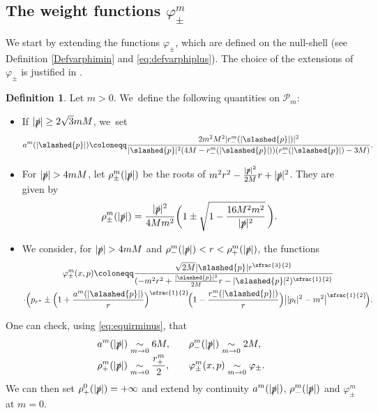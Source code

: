 \documentclass[JEP,XML,SOM,Unicode,published]{cedram}
\theoremstyle{plain}
\theoremstyle{definition}
\newtheorem{definition}[proposition]{Definition}
\newcommand{\isEquivTo}[1]{\underset{#1}{\sim}}
\begin{document}
\subsection{The weight functions $\varphi_{\pm}^m$}

We start by extending the functions $\varphi_\pm$, which are defined on the null-shell (see Definition \ref{Defvarphimin} and \eqref{eq:defvarphiplus}). The choice of the extensions of $\varphi_\pm$ is justified in \cite[\S 5.1.4]{V24}.

\begin{definition}
Let $m > 0$. We~define the following quantities on $\mathcal{P}_m$:
\begin{itemize}
\item If $|\slashed{p}| \geq 2\sqrt{3}mM$, we~set
\[
a^m(|\slashed{p}|) \coloneqq \frac{2m^2M^2|r^{m}_-(|\slashed{p}|)|^3}{|\slashed{p}|^2(4M-r^{m}_-(|\slashed{p}|))(r^{m}_-(|\slashed{p}|)-3M)}.
\]
\item For $|\slashed{p}| >4mM$, let $\rho^m_{\pm}(|\slashed{p}|)$ be the roots of $m^2 r^2-\frac{|\slashed{p}|^2}{2M}r+|\slashed{p}|^2$. They are given by
\[
\rho_{\pm}^{m}(|\slashed{p}|)=\frac{|\slashed{p}|^2}{4Mm^2}\biggl(1\pm \sqrt{1-\frac{16M^2m^2}{|\slashed{p}|^2}} \, \biggr).
\]
\item We consider, for $|\slashed{p}| >4mM$ and $ \rho_{-}^{m}(|\slashed{p}|) < r < \rho_{+}^{m}(|\slashed{p}|)$, the functions
\begin{multline*}
\varphi_{\pm}^m(x,p) \coloneqq \frac{ \sqrt{2M}|\slashed{p}|r^{\sfrac{3}{2}}}{(-m^2r^2+\frac{|\slashed{p}|^2}{2M}r-|\slashed{p}|^2)^{\sfrac{1}{2}}}\\
\cdot\Bigl(p_{r^*}\pm\Bigl(1+\frac{a^{m}(|\slashed{p}|)}{r}\Bigr)^{\sfrac{1}{2}}\!\Bigl(1-\frac{r^{m}_-(|\slashed{p}|)}{r}\Bigr)\big||p_t|^2-m^2\big|^{\sfrac{1}{2}} \! \Bigr).
\end{multline*}
\end{itemize}
\end{definition}

One can check, using \eqref{eq:equirminus}, that\vspace*{-3pt}
\begin{equation}\label{eq:mto0}
\begin{alignedat}{2}
&a^m(|\slashed{p}|) \isEquivTo{m \to 0} 6M,\qquad &&\rho^m_-(|\slashed{p}|) \isEquivTo{m \to 0} 2M, \\[-3pt]
&\rho^m_+(|\slashed{p}|) \isEquivTo{m \to 0} \frac{r_+^m}{2}, \quad &&\varphi_\pm^m(x,p) \isEquivTo{m \to 0} \varphi_\pm.
\end{alignedat}
\end{equation}
We can then set $\rho^0_+(|\slashed{p}|)=+\infty$ and extend by continuity $a^m(|\slashed{p}|)$, $\rho_-^m(|\slashed{p}|)$ and $\varphi_\pm^m$ at $m=0$.
\end{document}
